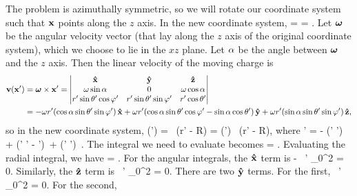 \begin{solution}
	The problem is azimuthally symmetric, so we will rotate our coordinate system such that $\vb{x}$ points along the $z$ axis.  In the new coordinate system,
	\beq
		 = 
		= .
	\eeq
	Let $\boldsymbol{\omega}$ be the angular velocity vector (that lay along the $z$ axis of the original coordinate system), which we choose to lie in the $xz$ plane.  Let $\alpha$ be the angle between $\boldsymbol{\omega}$ and the $z$ axis.  Then the linear velocity of the moving charge is
	\begin{align*}
		\vv(\vx') &= \vomg \times \vx'
		= \mqty| \xh & \yh & \zh \\
			\omg \sin\alp & 0 & \omg \cos\alp \\
			r' \sin\tht' \cos\vph' & r' \sin\tht' \sin\vph' & r' \cos\tht' | \\
		&= - \omg r' (\cos\alp \sin\tht' \sin\vph') \,\xh + \omg r' (\cos\alp \sin\tht' \cos\vph' - \sin\alp \cos\tht') \,\yh + \omg r' (\sin\alp \sin\tht' \sin\vph') \,\zh,
	\end{align*}
	so in the new coordinate system,
	\beq
		\vJ(\vx') =   \, \delta(r' - R)
		=   (\omgh \times \xh') \, \delta(r' - R),
	\eeq
	where
	\beq
		\omgh \times \xh' = - (\cos\alp \sin\tht' \sin\vph') \,\xh + (\cos\alp \sin\tht' \cos\vph' - \sin\alp \cos\tht') \,\yh + (\sin\alp \sin\tht' \sin\vph') \,\zh.
	\eeq
	The integral we need to evaluate becomes
	\beq
		\vAx =   \intotp \intono \intoi {} \drp \dctp \dvp.
	\eeq
	Evaluating the radial integral, we have
	\beq
		\vAx =  \intotp \intono {} \dctp \dvp.
	\eeq
	For the angular integrals, the $\vb{\hat{x}}$ term is
	\beq
		- \cos\alp \,\xh \intono {} \dctp \intotp \sin\vph' \dvp
		\propto {}_0^{2\pi}
		= 0.
	\eeq
	Similarly, the $\vb{\hat{z}}$ term is
	\beq
		\sin\alp \,\zh \intono {} \dctp \intotp \sin\vph' \dvp
		\propto {}_0^{2\pi}
		= 0.
	\eeq
	There are two $\vb{\hat{y}}$ terms.  For the first,
	\beq
		\cos\alp \,\yh \intono {} \dctp \intotp \cos\vph' \dvp
		\propto {}_0^{2\pi}
		= 0.
	\eeq
	For the second,
	\begin{align*}

\end{align*}
\end{solution}
